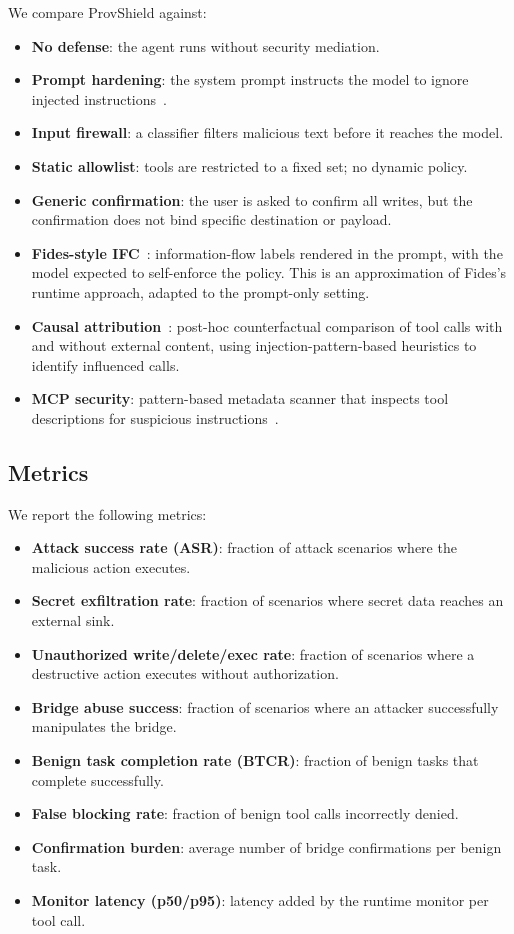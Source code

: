 \documentclass[sigconf,anonymous,review]{acmart}
\begin{document}
We compare ProvShield against:
\begin{itemize}
  \item \textbf{No defense}: the agent runs without security mediation.
  \item \textbf{Prompt hardening}: the system prompt instructs the model to ignore injected instructions~\cite{openai_agent_prompt_injection_defense}.
  \item \textbf{Input firewall}: a classifier filters malicious text before it reaches the model.
  \item \textbf{Static allowlist}: tools are restricted to a fixed set; no dynamic policy.
  \item \textbf{Generic confirmation}: the user is asked to confirm all writes, but the confirmation does not bind specific destination or payload.
  \item \textbf{Fides-style IFC}~\cite{fides_agent_ifc}: information-flow labels rendered in the prompt, with the model expected to self-enforce the policy. This is an approximation of Fides's runtime approach, adapted to the prompt-only setting.
  \item \textbf{Causal attribution}~\cite{attriguard_agentwatcher}: post-hoc counterfactual comparison of tool calls with and without external content, using injection-pattern-based heuristics to identify influenced calls.
  \item \textbf{MCP security}: pattern-based metadata scanner that inspects tool descriptions for suspicious instructions~\cite{mcp_safety_audit}.
\end{itemize}

\subsection{Metrics}
\label{sec:eval-metrics}

We report the following metrics:
\begin{itemize}
  \item \textbf{Attack success rate (ASR)}: fraction of attack scenarios where the malicious action executes.
  \item \textbf{Secret exfiltration rate}: fraction of scenarios where secret data reaches an external sink.
  \item \textbf{Unauthorized write/delete/exec rate}: fraction of scenarios where a destructive action executes without authorization.
  \item \textbf{Bridge abuse success}: fraction of scenarios where an attacker successfully manipulates the bridge.
  \item \textbf{Benign task completion rate (BTCR)}: fraction of benign tasks that complete successfully.
  \item \textbf{False blocking rate}: fraction of benign tool calls incorrectly denied.
  \item \textbf{Confirmation burden}: average number of bridge confirmations per benign task.
  \item \textbf{Monitor latency (p50/p95)}: latency added by the runtime monitor per tool call.
\end{itemize}
\end{document}
